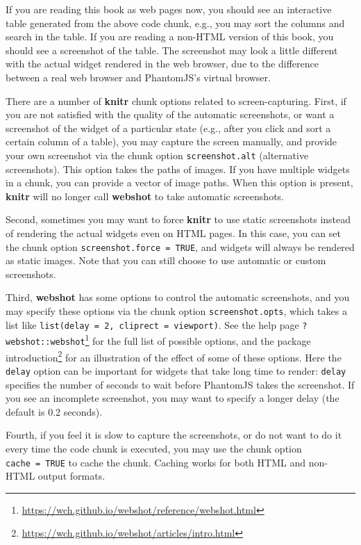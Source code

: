 \documentclass[
  12pt,
]{krantz}
\renewcommand{\href}[2]{#2\footnote{\url{#1}}}
\theoremstyle{definition}
\theoremstyle{definition}
\theoremstyle{definition}
\theoremstyle{definition}
\theoremstyle{remark}
\begin{document}
If you are reading this book as web pages now, you should see an interactive table generated from the above code chunk, e.g., you may sort the columns and search in the table. If you are reading a non-HTML version of this book, you should see a screenshot of the table. The screenshot may look a little different with the actual widget rendered in the web browser, due to the difference between a real web browser and PhantomJS's virtual browser.

There are a number of \textbf{knitr} chunk options related to screen-capturing. First, if you are not satisfied with the quality of the automatic screenshots, or want a screenshot of the widget of a particular state (e.g., after you click and sort a certain column of a table), you may capture the screen manually, and provide your own screenshot via the chunk option \texttt{screenshot.alt} (alternative screenshots). This option takes the paths of images. If you have multiple widgets in a chunk, you can provide a vector of image paths. When this option is present, \textbf{knitr} will no longer call \textbf{webshot} to take automatic screenshots.

Second, sometimes you may want to force \textbf{knitr} to use static screenshots instead of rendering the actual widgets even on HTML pages. In this case, you can set the chunk option \texttt{screenshot.force\ =\ TRUE}, and widgets will always be rendered as static images. Note that you can still choose to use automatic or custom screenshots.

Third, \textbf{webshot} has some options to control the automatic screenshots, and you may specify these options via the chunk option \texttt{screenshot.opts}, which takes a list like \texttt{list(delay\ =\ 2,\ cliprect\ =\ \textquotesingle{}viewport\textquotesingle{})}. See the help page \href{https://wch.github.io/webshot/reference/webshot.html}{\texttt{?webshot::webshot}} for the full list of possible options, and the \href{https://wch.github.io/webshot/articles/intro.html}{package introduction} for an illustration of the effect of some of these options. Here the \texttt{delay} option can be important for widgets that take long time to render: \texttt{delay} specifies the number of seconds to wait before PhantomJS takes the screenshot. If you see an incomplete screenshot, you may want to specify a longer delay (the default is 0.2 seconds).

Fourth, if you feel it is slow to capture the screenshots, or do not want to do it every time the code chunk is executed, you may use the chunk option \texttt{cache\ =\ TRUE} to cache the chunk. Caching works for both HTML and non-HTML output formats.
\end{document}
